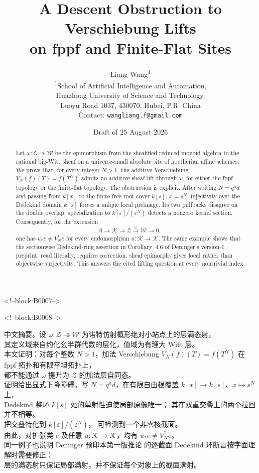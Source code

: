 \documentclass[11pt]{article}
\title{\textbf{A Descent Obstruction to Verschiebung Lifts\\
on fppf and Finite-Flat Sites}}
\author{Liang Wang\textsuperscript{1}\\
\small \textsuperscript{1}School of Artificial Intelligence and Automation,\\
\small Huazhong University of Science and Technology,\\
\small Luoyu Road 1037, 430070, Hubei, P.R. China\\
\small Contact: \texttt{wangliang.f@gmail.com}}
\date{Draft of 25 August 2026}
\theoremstyle{definition}
\newcommand{\latin}[1]{{\rmfamily #1}}
\begin{document}
\maketitle

<!--block:B0007-->
\begin{abstract}
Let \(\omega\colon\mathcal Z\twoheadrightarrow\mathcal W\) be the
epimorphism from the sheafified reduced monoid algebra to the rational
big-Witt sheaf on a universe-small absolute site of noetherian affine
schemes.  We prove that, for every integer \(N>1\), the additive
Verschiebung \(V_N(f)(T)=f(T^N)\) admits no additive sheaf lift through
\(\omega\), for either the fppf topology or the finite-flat topology.
The obstruction is explicit.  After writing \(N=q^a d\) and passing from
\(k[x]\) to the finite-free root cover \(k[s]\), \(x=s^N\), injectivity
over the Dedekind domain \(k[s]\) forces a unique local preimage.  Its two
pullbacks disagree on the double overlap; specialization to
\(k[\varepsilon]/(\varepsilon^N)\) detects a nonzero kernel section.
Consequently, for the extension
\[
0\longrightarrow\mathcal K\longrightarrow\mathcal Z
 \xrightarrow{\omega}\mathcal W\longrightarrow0,
\]
one has \(u_*e\ne V_N^*e\) for every endomorphism
\(u\colon\mathcal K\to\mathcal K\).  The same example shows that the
sectionwise Dedekind-ring assertion in Corollary~4.6 of Deninger's
version-1 preprint, read literally, requires correction: sheaf
epimorphy gives local rather than objectwise surjectivity.
This answers the cited lifting question at every nontrivial index.
\end{abstract}

<!--block:B0008-->
\begin{center}
\begin{minipage}{0.94\textwidth}
{\zhfont\small\RaggedRight
中文摘要。设 \(\omega\colon\mathcal Z\twoheadrightarrow\mathcal W\)
为诺特仿射概形绝对小站点上的层满态射，\\
其定义域来自约化幺半群代数的层化，值域为有理大
\latin{Witt} 层。\\
本文证明：对每个整数 \(N>1\)，加法 \latin{Verschiebung}
\(V_N(f)(T)=f(T^N)\) 在 \latin{fppf} 拓扑和有限平坦拓扑上，\\
都不能通过 \(\omega\) 提升为 \(\mathcal Z\) 的加法层自同态。\\
证明给出显式下降障碍。写 \(N=q^a d\)，在有限自由根覆盖
\(k[x]\to k[s]\)、\(x\mapsto s^N\) 上，\\
\latin{Dedekind} 整环 \(k[s]\) 处的单射性迫使局部原像唯一；
其在双重交叠上的两个拉回并不相等。\\
把交叠特化到 \(k[\varepsilon]/(\varepsilon^N)\)，
可检测到一个非零核截面。\\
由此，对扩张类 \(e\) 及任意
\(u\colon\mathcal K\to\mathcal K\)，均有 \(u_*e\ne V_N^*e\)。\\
同一例子也说明 \latin{Deninger} 预印本第一版推论 \latin{4.6}
的逐截面 \latin{Dedekind} 环断言按字面理解时需要修正：\\
层的满态射只保证局部满射，并不保证每个对象上的截面满射。
}
\end{minipage}
\end{center}
\end{document}
